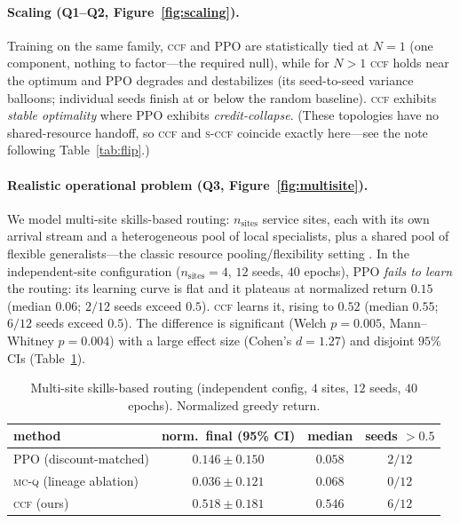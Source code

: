 \documentclass[review,authoryear,3p,times]{elsarticle}
\newcommand{\ccf}{\textsc{ccf}}
\newcommand{\sccf}{\textsc{s-ccf}}
\newcommand{\mcq}{\textsc{mc-q}}
\begin{document}
\paragraph{Scaling (Q1--Q2, Figure~\ref{fig:scaling}).} Training on the same
family, \ccf{} and PPO are statistically tied at $N{=}1$ (one component, nothing
to factor---the required null), while for $N>1$ \ccf{} holds near the optimum and
PPO degrades and destabilizes (its seed-to-seed variance balloons; individual
seeds finish at or below the random baseline). \ccf{} exhibits
\emph{stable optimality} where PPO exhibits \emph{credit-collapse}. (These
topologies have no shared-resource handoff, so \ccf{} and \sccf{} coincide
exactly here---see the note following Table~\ref{tab:flip}.)

\paragraph{Realistic operational problem (Q3, Figure~\ref{fig:multisite}).} We
model multi-site skills-based routing: $n_{\text{sites}}$ service sites, each with
its own arrival stream and a heterogeneous pool of local specialists, plus a
shared pool of flexible generalists---the classic resource pooling/flexibility
setting \citep{pooling_flexibility}. In the independent-site configuration
($n_{\text{sites}}{=}4$, $12$ seeds, $40$ epochs), PPO \emph{fails to learn} the
routing: its learning curve is flat and it plateaus at normalized return $0.15$
(median $0.06$; $2/12$ seeds exceed $0.5$). \ccf{} learns it, rising to $0.52$
(median $0.55$; $6/12$ seeds exceed $0.5$). The difference is significant
(Welch $p=0.005$, Mann--Whitney $p=0.004$) with a large effect size (Cohen's
$d=1.27$) and disjoint $95\%$ CIs (Table~\ref{tab:multisite}).

\begin{table}[t]
\centering
\caption{Multi-site skills-based routing (independent config, $4$ sites, $12$
seeds, $40$ epochs). Normalized greedy return.}
\label{tab:multisite}
\begin{tabular}{lccc}
\toprule
method & norm.\ final (95\% CI) & median & seeds $>0.5$ \\
\midrule
PPO (discount-matched) & $0.146 \pm 0.150$ & $0.058$ & $2/12$ \\
\mcq{} (lineage ablation) & $0.036 \pm 0.121$ & $0.068$ & $0/12$ \\
\ccf{} (ours)          & $\mathbf{0.518 \pm 0.181}$ & $0.546$ & $6/12$ \\
\bottomrule
\end{tabular}
\end{table}
\end{document}

